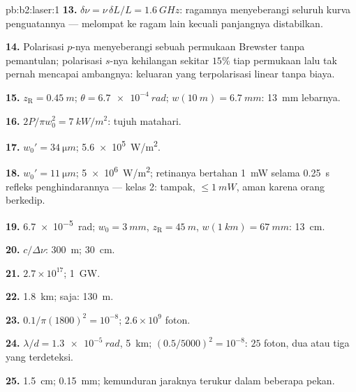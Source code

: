 \begin{solution}{pb:b2:laser:1}
\textbf{13.} $\delta\nu = \nu\,\delta L/L = \qty{1.6}{GHz}$: ragamnya menyeberangi
seluruh kurva penguatannya ---  melompat ke ragam lain kecuali panjangnya
distabilkan.

\textbf{14.} Polarisasi $p$-nya menyeberangi sebuah permukaan Brewster tanpa
pemantulan; polarisasi $s$-nya kehilangan sekitar $15\%$ tiap permukaan lalu
tak pernah mencapai ambangnya: keluaran yang terpolarisasi linear tanpa biaya.

\textbf{15.} $z_{\text{R}} = \qty{0.45}{m}$; $\theta = \qty{6.7e-4}{rad}$; $w(\qty{10}{m})
= \qty{6.7}{mm}$: \qty{13}{mm} lebarnya.

\textbf{16.} $2P/\pi w_0^2 = \qty{7}{kW/m^2}$: tujuh matahari.

\textbf{17.} $w_0' = \qty{34}{\micro m}$; \qty{5.6e5}{W/m^2}.

\textbf{18.} $w_0' = \qty{11}{\micro m}$; \qty{5e6}{W/m^2}; retinanya bertahan
\qty{1}{mW} selama \qty{0.25}{s} refleks penghindarannya --- kelas 2: tampak,
$\le \qty{1}{mW}$, aman karena orang berkedip.

\textbf{19.} \qty{6.7e-5}{rad}; $w_0 = \qty{3}{mm}$, $z_{\text{R}} = \qty{45}{m}$,
$w(\qty{1}{km}) = \qty{67}{mm}$: \qty{13}{cm}.

\textbf{20.} $c/\Delta\nu$: \qty{300}{m}; \qty{30}{cm}.

\textbf{21.} $2.7 \times 10^{17}$; \qty{1}{GW}.

\textbf{22.} \qty{1.8}{km};  saja: \qty{130}{m}.

\textbf{23.} $0.1/\pi(1800)^2 = 10^{-8}$; $2.6 \times 10^9$ foton.

\textbf{24.} $\lambda/d = \qty{1.3e-5}{rad}$, \qty{5}{km}; $(0.5/5000)^2 = 10^{-8}$:
$25$ foton, dua atau tiga yang terdeteksi.

\textbf{25.} \qty{1.5}{cm}; \qty{0.15}{mm}; kemunduran jaraknya terukur dalam
beberapa pekan.
\end{solution}

